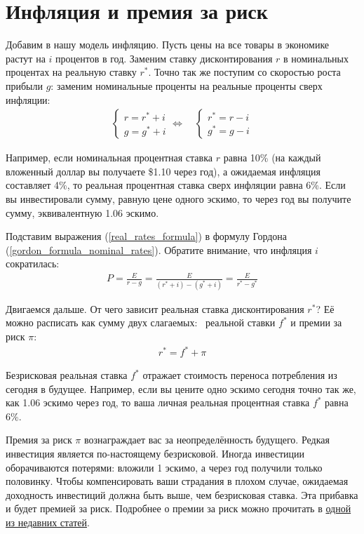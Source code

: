 \section*{Инфляция и премия за риск}

Добавим в нашу модель инфляцию. Пусть цены на все товары в экономике растут на $i$ процентов в год. Заменим ставку дисконтирования $r$ в номинальных процентах на реальную ставку $r^*$. Точно так же поступим со скоростью роста прибыли $g$: заменим номинальные проценты на реальные проценты сверх инфляции:
\begin{align}
\begin{cases}
r = r^* + i \\
g = g^* + i
\end{cases}
\Leftrightarrow
\quad
\begin{cases}
r^* = r - i \\
g^* = g - i
\end{cases}
\label{real_rates_formula}
\end{align}

Например, если номинальная процентная ставка $r$ равна 10\% (на каждый вложенный доллар вы получаете \$1.10 через год), а ожидаемая инфляция составляет 4\%, то реальная процентная ставка сверх инфляции равна 6\%. Если вы инвестировали сумму, равную цене одного эскимо, то через год вы получите сумму, эквивалентную 1.06 эскимо.

Подставим выражения (\ref{real_rates_formula}) в формулу Гордона  (\ref{gordon_formula_nominal_rates}). Обратите внимание, что инфляция $i$ сократилась:
\begin{align}
P = \frac{E}{r - g} = \frac{E}{(r^* + i) - (g^* + i)} =  \frac{E}{r^* - g^*} 
\label{gordon_formula_real_rates}
\end{align}

Двигаемся дальше. От чего зависит реальная ставка дисконтирования $r^*$? Её можно расписать как сумму двух слагаемых: \ реальной ставки $f^*$ и премии за риск $\pi$:
\begin{align}
r^* = f^* + \pi
\label{risk_premium_formula}
\end{align}

Безрисковая реальная ставка $f^*$ отражает стоимость переноса потребления из сегодня в будущее. Например, если вы цените одно эскимо сегодня точно так же, как 1.06 эскимо через год, то ваша личная реальная процентная ставка $f^*$ равна $6\%$.

Премия за риск $\pi$ вознаграждает вас за неопределённость будущего. Редкая инвестиция является по-настоящему безрисковой. Иногда инвестиции оборачиваются потерями: вложили 1 эскимо, а через год получили только половинку. Чтобы компенсировать ваши страдания в плохом случае, ожидаемая доходность инвестиций должна быть выше, чем безрисковая ставка. Эта прибавка и будет премией за риск. Подробнее о премии за риск можно прочитать в \href{https://habr.com/ru/company/dbtc/blog/527050/}{одной из недавних статей}.

